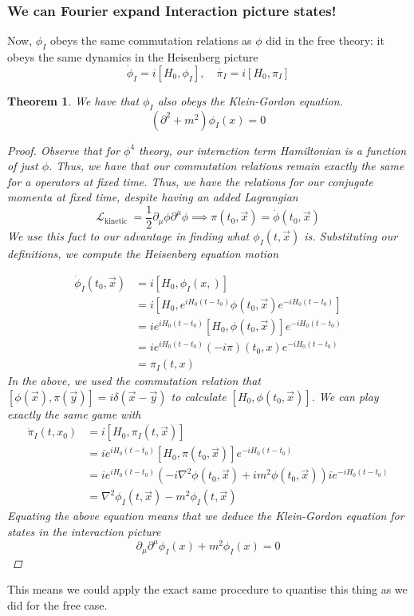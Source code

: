 \documentclass[11pt, oneside]{article}   	%
\theoremstyle{newline}
\theoremstyle{newline}
\newtheorem*{thm}{Theorem}
\theoremstyle{newline}
\theoremstyle{newline}
\theoremstyle{newline}
\begin{document}
\subsubsection{We can Fourier expand Interaction picture states!} 
Now, $ \phi_ I $ obeys the same commutation relations
as $ \phi $ did in the free theory: it obeys the same dynamics 
in the Heisenberg picture
\[
\dot{ \phi} _ I  = i [ H_0 , \phi_I ], \quad \dot{ \pi_I } = i [ H_0 , \pi_I]  
\] 
\begin{thm}
We have that $ \phi_ I $ also obeys the Klein-Gordon equation. 
\[
( \partial  ^ 2 + m ^ 2 ) \phi_ I ( x) = 0 
\]
\begin{proof}
Observe that for $ \phi ^ 4 $ theory, our interaction term Hamiltonian 
is a function of just $ \phi $. Thus, we have that our commutation relations remain 
exactly the same for a operators at fixed time. Thus, we have the relations for 
our conjugate momenta at fixed time, despite having an added Lagrangian
\[	
\mathcal{ L }_{\text{kinetic }}  = \frac{1}{2 } \partial _\mu \phi \partial  ^\mu \phi \implies \pi ( t_0, \vec{x} )  = \dot{\phi } ( t_0 , \vec{x} )   
\] We use this fact to our advantage in finding what 
$ \phi _ I  ( t, \vec{x} ) $  is. 
Substituting our definitions, we compute the Heisenberg equation motion 

\begin{align*}
\dot{ \phi }_I ( t_0, \vec{x} ) &=  i [ H_0 , \phi_I ( x, ) ]  \\
&=  i [ H_0 , e^{ i H_0 ( t - t_0 )  } \phi ( t_0 , \vec{x} ) e^{ - i H_0 ( t - t_0 ) }]   \\
&= i e^{ i H_0 (  t- t_0 ) } [ H_0 , \phi ( t_0, \vec{x} )  ] e^{ - i H_0 ( t - t_0 ) } \\
&= i e^{ i H_0 ( t - t_0 ) } ( - i  \pi)  ( t_0 , x ) e^{  - i H_0 ( t - t_0 ) } \\
	&=   \pi_ I ( t, x )  
\end{align*} In the above, we used the commutation relation that 
$ [ \phi ( \vec{x} ) , \pi ( \vec{y} ) ] = i \delta ( \vec{x} - \vec{y} ) $ 
to calculate $ [ H_0 , \phi ( t_0 , \vec{x} ) ] $. 
We can play exactly the same game with 
\begin{align*}
\dot{ \pi} _I ( t, x_0 ) &=  i [ H_0 , \pi_I ( t , \vec{x} ) ]  \\
&=  i e^{ i H_0 (  t- t_0 ) } [ H_0 , \pi ( t_0, \vec{x} ) ] e^{  - i H_0 ( t - t_0 ) } \\
&=  i e^{ i H_0 ( t - t_0 ) } ( - i \nabla ^ 2 \phi ( t_0 , \vec{x} ) + i m ^ 2 \phi ( t_0 , \vec{x} ) ) i e ^{  - i H_0 ( t -t_0 ) }  \\
&=  \nabla ^2 \phi_ I ( t, \vec{x} ) - m ^ 2 \phi _ I ( t, \vec{x} ) 
\end{align*}
Equating the above equation means that we deduce the Klein-Gordon equation for states in the interaction 
picture
\[
\partial _\mu \partial  ^\mu \phi_ I ( x  ) + m ^ 2 \phi_I  ( x)  =0 
\] 
\end{proof}
\end{thm} This means we could apply the exact same procedure to 
quantise this thing as we did for the free case.
\end{document}
